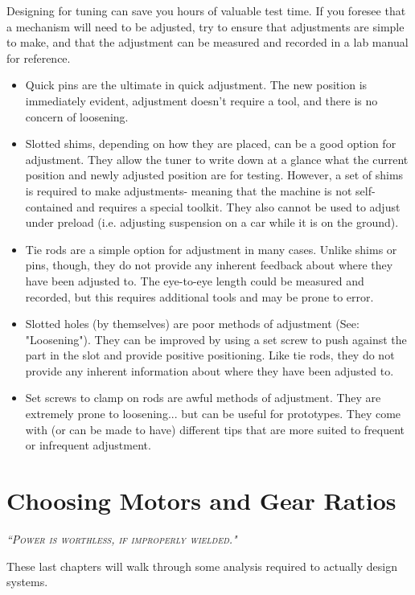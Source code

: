 Designing for tuning can save you hours of valuable test time. If you foresee that a mechanism will need to be adjusted, try to ensure that adjustments are simple to make, and that the adjustment can be measured and recorded in a lab manual for reference.
\begin{itemize}
	\item Quick pins are the ultimate in quick adjustment. The new position is immediately evident, adjustment doesn't require a tool, and there is no concern of loosening.
	\item Slotted shims, depending on how they are placed, can be a good option for adjustment. They allow the tuner to write down at a glance what the current position and newly adjusted position are for testing. However, a set of shims is required to make adjustments- meaning that the machine is not self-contained and requires a special toolkit. They also cannot be used to adjust under preload (i.e. adjusting suspension on a car while it is on the ground).
	\item Tie rods are a simple option for adjustment in many cases. Unlike shims or pins, though, they do not provide any inherent feedback about where they have been adjusted to. The eye-to-eye length could be measured and recorded, but this requires additional tools and may be prone to error.
	\item Slotted holes (by themselves) are poor methods of adjustment (See: "Loosening"). They can be improved by using a set screw to push against the part in the slot and provide positive positioning. Like tie rods, they do not provide any inherent information about where they have been adjusted to.
	\item Set screws to clamp on rods are awful methods of adjustment. They are extremely prone to loosening... but can be useful for prototypes. They come with (or can be made to have) different tips that are more suited to frequent or infrequent adjustment.
\end{itemize}

\chapter{Choosing Motors and Gear Ratios}

 {\slshape \scshape ``Power is worthless, if improperly wielded."}
 
These last chapters will walk through some analysis required to actually design systems.


